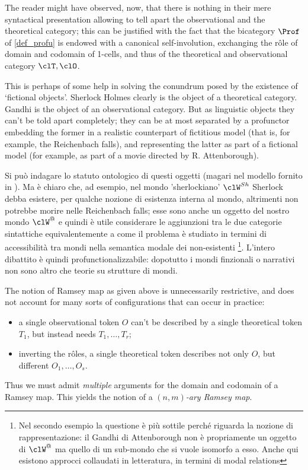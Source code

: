 \begin{remark}
	The reader might have observed, now, that there is nothing in their mere syntactical presentation allowing to tell apart the observational and the theoretical category; this can be justified with the fact that the bicategory $\Prof$ of \autoref{def_profu} is endowed with a canonical self-involution, exchanging the r\^ole of domain and codomain of 1-cells, and thus of the theoretical and observational category $\clT,\clO$.
	
	This is perhaps of some help in solving the conundrum posed by the existence of `fictional objects'. Sherlock Holmes clearly is the object of a theoretical category. Gandhi is the object of an observational category. But as linguistic objects they can't be told apart completely; they can be at most separated by a profunctor embedding the former in a realistic counterpart of fictitious model (that is, for example, the Reichenbach falls), and representing the latter as part of a fictional model (for example, as part of a movie directed by R. Attenborough).

	Si può indagare lo statuto ontologico di questi oggetti (magari nel modello fornito in \cite{catont1}). Ma è chiaro che, ad esempio, nel mondo 'sherlockiano' $\clW^{Sh}$ Sherlock debba esistere, per qualche nozione di esistenza interna al mondo, altrimenti non potrebbe morire nelle Reichenbach falls; esse sono anche un oggetto del nostro mondo $\clW^@$ e quindi è utile considerare le aggiunzioni tra le due categorie sintattiche equivalentemente a come il problema è studiato in termini di accessibilità tra mondi nella semantica modale dei non-esistenti \cite{} \footnote{Nel secondo esempio la questione è più sottile perché riguarda la nozione di rappresentazione: il Gandhi di Attenborough non è propriamente un oggetto di $\clW^@$ ma quello di un sub-mondo che si vuole isomorfo a esso. Anche qui esistono approcci collaudati in letteratura, in termini di modal relations}. L'intero dibattito è quindi profunctionalizzabile: dopotutto i mondi finzionali o narrativi non sono altro che teorie su strutture di mondi. 
\end{remark}
\begin{remark}\label{multiramsey}
	The notion of Ramsey map as given above is unnecessarily restrictive, and does not account for many sorts of configurations that can occur in practice:
	\begin{itemize}
		\item a single observational token $O$ can't be described by a single theoretical token $T_1$, but instead needs $T_1,\dots,T_r$;
		\item inverting the r\^oles, a single theoretical token describes not only $O$, but different $O_1,\dots,O_s$.
	\end{itemize}
	Thus we must admit \emph{multiple} arguments for the domain and codomain of a Ramsey map. This yields the notion of a \emph{$(n,m)$-ary Ramsey map}.
\end{remark}
